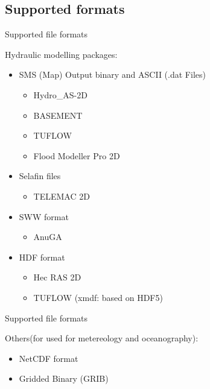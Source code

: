 \subsection{Supported formats}
\begin{frame}{Supported file formats}
	\begin{block}{Hydraulic modelling packages:}
		\begin{itemize}
			\item SMS (Map) Output binary and ASCII (.dat Files)
				\begin{itemize}
					\item Hydro\_AS-2D
					\item BASEMENT
					\item TUFLOW
					\item Flood Modeller Pro 2D
				\end{itemize}
			\item Selafin files
					\begin{itemize}
						\item TELEMAC 2D
					\end{itemize}
			\item SWW format
					\begin{itemize}
						\item AnuGA
					\end{itemize}
			\item HDF format
					\begin{itemize}
						\item Hec RAS 2D
						\item TUFLOW (xmdf: based on HDF5)
					\end{itemize}
		\end{itemize}
	
	\end{block}
	
\end{frame}

\begin{frame}{Supported file formats}
	\begin{block}{Others(for used for metereology and oceanography):}
		\begin{itemize}
			\item NetCDF format
			\item Gridded Binary (GRIB)
		\end{itemize}
		
	\end{block}


\end{frame}

